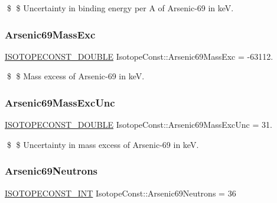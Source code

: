 \$ \$ Uncertainty in binding energy per A of Arsenic-\/69 in keV. \mbox{\label{group___isotope_const-_arsenic-_as69_ga568694fd8a6bbd05f97948c69b3860bc}} 
\subsubsection{\texorpdfstring{Arsenic69\+Mass\+Exc}{Arsenic69MassExc}}
{\footnotesize\ttfamily \mbox{\hyperlink{group___isotope_const-_macros_ga8f45a7272ce02c0b4c65c44636ed719a}{I\+S\+O\+T\+O\+P\+E\+C\+O\+N\+S\+T\+\_\+\+D\+O\+U\+B\+LE}} Isotope\+Const\+::\+Arsenic69\+Mass\+Exc = -\/63112.}

\$ \$ Mass excess of Arsenic-\/69 in keV. \mbox{\label{group___isotope_const-_arsenic-_as69_gaaea15ed71c36b4a4c63290e42cc34a7e}} 
\subsubsection{\texorpdfstring{Arsenic69\+Mass\+Exc\+Unc}{Arsenic69MassExcUnc}}
{\footnotesize\ttfamily \mbox{\hyperlink{group___isotope_const-_macros_ga8f45a7272ce02c0b4c65c44636ed719a}{I\+S\+O\+T\+O\+P\+E\+C\+O\+N\+S\+T\+\_\+\+D\+O\+U\+B\+LE}} Isotope\+Const\+::\+Arsenic69\+Mass\+Exc\+Unc = 31.}

\$ \$ Uncertainty in mass excess of Arsenic-\/69 in keV. \mbox{\label{group___isotope_const-_arsenic-_as69_ga8be53445712bdc7f6b1cbec2e27ede64}} 
\subsubsection{\texorpdfstring{Arsenic69\+Neutrons}{Arsenic69Neutrons}}
{\footnotesize\ttfamily \mbox{\hyperlink{group___isotope_const-_macros_ga5f18360b3e99483a35c32d789e62621c}{I\+S\+O\+T\+O\+P\+E\+C\+O\+N\+S\+T\+\_\+\+I\+NT}} Isotope\+Const\+::\+Arsenic69\+Neutrons = 36}

